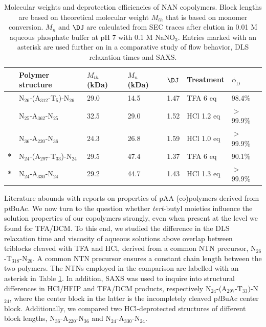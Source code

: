 \documentclass{article}
\begin{document}
\begin{table}
\centering
\caption{Molecular weights and deprotection efficiencies of NAN copolymers. 
Block lengths are based on theoretical molecular weight $M_{th}$ that is based on 
monomer conversion. 
$M_n$ and $\DJ$ are calculated from SEC traces after elution in 
0.01 M aqueous phosphate buffer at pH 7 with 0.1 M NaNO$_3$. Entries marked with an 
asterisk are used further on in a comparative study of flow behavior, DLS relaxation times and SAXS.}
\begin{tabular}{lllllll}
\toprule
&Polymer structure 	&$M_{th}$ (kDa) & $M_{n}$  (kDa)&		$\DJ$&		Treatment&	$\mathrm{\phi}_\mathrm{D}$\\
\midrule
&N$_\mathrm{26}$-(A$_\mathrm{312}$-T$_\mathrm{5}$)-N$_\mathrm{26}$	&	29.0	&	14.5		&	1.47		&TFA 6 eq	&	98.4\% \\
&N$_\mathrm{25}$-A$_\mathrm{362}$-N$_\mathrm{25}$							&	32.5	&	29.0	&	1.52	&HCl 1.2 eq&	$>$99.9\% \\
&N$_\mathrm{36}$-A$_\mathrm{220}$-N$_\mathrm{36}$			&	24.3	&	26.8		&	1.59	&HCl 1.0 eq 		&		$>$99.9\% \\
\textbf{*}&N$_\mathrm{24}$-(A$_\mathrm{297}$-T$_\mathrm{33}$)-N$_\mathrm{24}$	&	29.5	&	47.4		&	1.37		&TFA 6 eq	&	90.1\%	\\
\textbf{*}&N$_\mathrm{24}$-A$_\mathrm{330}$-N$_\mathrm{24}$							&	29.2	&	44.7		&	1.43		&HCl 1.3 eq&$>$99.9\%	\\
\bottomrule
\end{tabular}

\label{tab:results}
\end{table}

Literature abounds with reports on properties of pAA (co)polymers derived
from p\emph{t}BuAc.\cite{Chen2013a, Maniego2017} 
We now turn to the question whether \emph{tert}-butyl moieties influence the solution 
properties of our copolymers strongly, even when present at the level we found for TFA/DCM. To this 
end, we studied the difference in the DLS relaxation time and viscosity of aqueous solutions above 
overlap between triblocks cleaved with TFA and HCl, derived from a common NTN precursor, 
N$_\mathrm{26}$-T$_\mathrm{318}$-N$_\mathrm{26}$. A common NTN precursor ensures a constant 
chain length between the two polymers. The NTNs employed in the comparison are labelled with an asterisk in Table \ref{tab:results}.
In addition, SAXS was used to inquire into structural differences in HCl/HFIP and TFA/DCM products, respectively
N$_\mathrm{24}$-(A$_\mathrm{297}$-T$_\mathrm{33}$)-N$_\mathrm{24}$, where the center block in the latter is
the incompletely cleaved p\emph{t}BuAc center block. Additionally,
we compared two HCl-deprotected structures of different block lengths, N$_\mathrm{36}$-A$_\mathrm{220}$-N$_\mathrm{36}$
and N$_\mathrm{24}$-A$_\mathrm{330}$-N$_\mathrm{24}$. 
\end{document}
